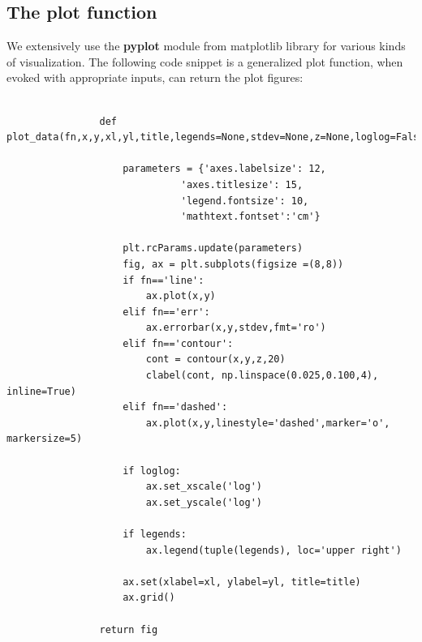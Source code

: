 \documentclass[11pt, a4paper]{article}
\begin{document}
        \subsection{The plot function}
            We extensively use the \textbf{pyplot} module from matplotlib library for various kinds of visualization. The following code snippet is a generalized plot function, when evoked with appropriate inputs, can return the plot figures:
            \begin{verbatim}
                                
                def plot_data(fn,x,y,xl,yl,title,legends=None,stdev=None,z=None,loglog=False):
                        	
                    parameters = {'axes.labelsize': 12,
                    		  'axes.titlesize': 15,
                    		  'legend.fontsize': 10,
                    		  'mathtext.fontset':'cm'}
                    
                    plt.rcParams.update(parameters)
                    fig, ax = plt.subplots(figsize =(8,8))
                    if fn=='line':
                    	ax.plot(x,y)
                    elif fn=='err':
                    	ax.errorbar(x,y,stdev,fmt='ro')
                    elif fn=='contour':
                    	cont = contour(x,y,z,20)
                    	clabel(cont, np.linspace(0.025,0.100,4), inline=True)
                    elif fn=='dashed':
                    	ax.plot(x,y,linestyle='dashed',marker='o', markersize=5)
                    
                    if loglog:
                    	ax.set_xscale('log')
                    	ax.set_yscale('log')
                    
                    if legends:
                    	ax.legend(tuple(legends), loc='upper right')
                    
                    ax.set(xlabel=xl, ylabel=yl, title=title)
                    ax.grid()
                
                return fig
            \end{verbatim}
        
\end{document}
